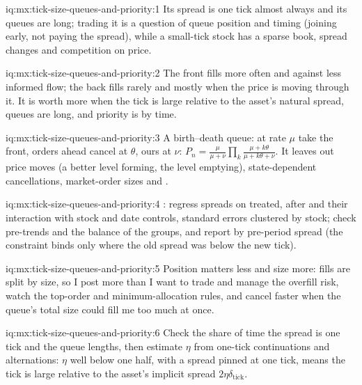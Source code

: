 \begin{solution}{iq:mx:tick-size-queues-and-priority:1}
Its spread is one tick almost always and its queues are long; trading it is a question of queue position and timing (joining early, not paying the
spread), while a small-tick stock has a sparse book, spread changes and competition on price.
\end{solution}

\begin{solution}{iq:mx:tick-size-queues-and-priority:2}
The front fills more often and against less informed flow; the back fills rarely and mostly when the price is moving through it. It is worth more when the
tick is large relative to the asset's natural spread, queues are long, and priority is by time.
\end{solution}

\begin{solution}{iq:mx:tick-size-queues-and-priority:3}
A birth--death queue:  at rate $\mu$ take the front, orders ahead cancel at $\theta$, ours at $\nu$: $P_n=\tfrac{\mu}{\mu+\nu}\prod_k\tfrac{\mu+k
\theta}{\mu+k\theta+\nu}$. It leaves out price moves (a better level forming, the level emptying), state-dependent cancellations, market-order sizes and
.
\end{solution}

\begin{solution}{iq:mx:tick-size-queues-and-priority:4}
: regress spreads on treated, after and their interaction with stock and date controls, standard errors clustered by stock;
check pre-trends and the balance of the groups, and report by pre-period spread (the constraint binds only where the old spread was below the new tick).
\end{solution}

\begin{solution}{iq:mx:tick-size-queues-and-priority:5}
Position matters less and size more: fills are split by size, so I post more than I want to trade and manage the overfill risk, watch the top-order and
minimum-allocation rules, and cancel faster when the queue's total size could fill me too much at once.
\end{solution}

\begin{solution}{iq:mx:tick-size-queues-and-priority:6}
Check the share of time the spread is one tick and the queue lengths, then estimate $\eta$ from one-tick continuations and alternations: $\eta$ well below
one half, with a spread pinned at one tick, means the tick is large relative to the asset's implicit spread $2\eta\delta_{\mathrm{tick}}$.
\end{solution}
